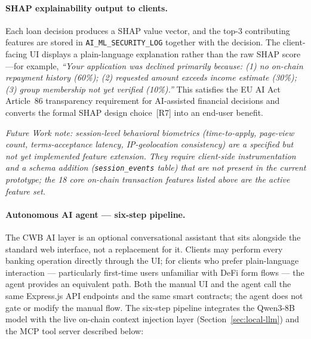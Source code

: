 \documentclass[12pt,a4paper]{report}
\begin{document}
\paragraph{SHAP explainability output to clients.}
Each loan decision produces a SHAP value vector, and the top-3 contributing features are stored in \texttt{AI\_ML\_SECURITY\_LOG} together with the decision. The client-facing UI displays a plain-language explanation rather than the raw SHAP score---for example, \emph{``Your application was declined primarily because: (1) no on-chain repayment history (60\%); (2) requested amount exceeds income estimate (30\%); (3) group membership not yet verified (10\%).''} This satisfies the EU AI Act Article~86 transparency requirement for AI-assisted financial decisions and converts the formal SHAP design choice~[R7] into an end-user benefit.

\noindent\textit{Future Work note: session-level behavioral biometrics (time-to-apply, page-view count, terms-acceptance latency, IP-geolocation consistency) are a specified but not yet implemented feature extension. They require client-side instrumentation and a schema addition (\texttt{session\_events} table) that are not present in the current prototype; the 18 core on-chain transaction features listed above are the active feature set.}

\paragraph{Autonomous AI agent --- six-step pipeline.}

The CWB AI layer is an optional conversational assistant that sits alongside the standard web interface, not a replacement for it. Clients may perform every banking operation directly through the UI; for clients who prefer plain-language interaction --- particularly first-time users unfamiliar with DeFi form flows --- the agent provides an equivalent path. Both the manual UI and the agent call the same Express.js API endpoints and the same smart contracts; the agent does not gate or modify the manual flow. The six-step pipeline integrates the Qwen3-8B model with the live on-chain context injection layer (Section~\ref{sec:local-llm}) and the MCP tool server described below:
\end{document}

